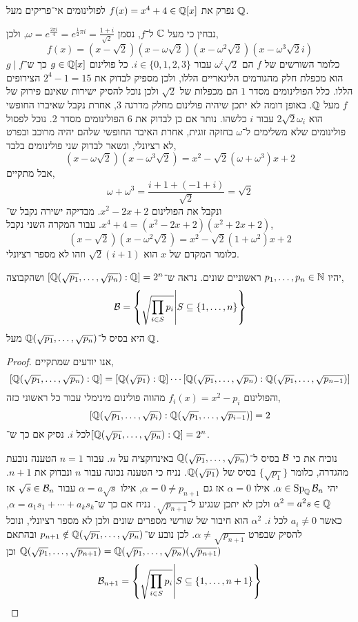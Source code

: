 \question{}
נפרק את $f(x) = x^4 + 4 \in \mathbb{Q}[x]$ לפולינומים אי־פריקים מעל $\mathbb{Q}$.
\begin{solution}
	נבחין כי מעל $\mathbb{C}$ ל־$f$, נסמן $\omega = e^{\frac{2 \pi i}{4}} = e^{\frac{1}{2} \pi i} = \frac{1 + i}{\sqrt{2}}$, ולכן,
	\[
		f(x)
		= (x - \sqrt{2})(x - \omega \sqrt{2})(x - \omega^2 \sqrt{2})(x - \omega^3 \sqrt{2} i)
	\]
	כלומר השורשים של $f$ הם $\omega^i \sqrt{2}$ עבור $i \in \{0, 1, 2, 3\}$.
	כל פולינום $g \in \mathbb{Q}[x]$ כך ש־$g \mid f$ הוא מכפלת חלק מהגורמים הלינאריים הללו, ולכן מספיק לבדוק את $2^4 - 1 = 15$ הצירופים הללו.
	כלל הפולינומים מסדר $1$ הם מכפלות של $\sqrt{2}$ ולכן נוכל להסיק ישירות שאינם פירוק של $f$ מעל $\mathbb{Q}$.
	באופן דומה לא יתכן שיהיה פולינום מחלק מדרגה 3, אחרת נקבל שאיברו החופשי הוא $2 \sqrt{2} \omega_i$ עבור $i$ כלשהו.
	נותר אם כן לבדוק את 6 הפולינומים מסדר 2.
	נוכל לפסול פולינומים שלא משלימים ל־$\omega$ בחזקה זוגית, אחרת האיבר החופשי שלהם יהיה מרוכב ובפרט לא רציונלי, ונשאר לבדוק שני פולינומים בלבד,
	\[
		(x - \omega \sqrt{2}) (x - \omega^3 \sqrt{2})
		= x^2 - \sqrt{2}(\omega + \omega^3) x + 2
	\]
	אבל מתקיים,
	\[
		\omega + \omega^3
		= \frac{i + 1 + (-1 + i)}{\sqrt{2}}
		= \sqrt{2}
	\]
	ונקבל את הפולינום $x^2 - 2x + 2$.
	מבדיקה ישירה נקבל ש־$x^4 + 4 = (x^2 - 2x + 2)(x^2 + 2x + 2)$.
	עבור המקרה השני נקבל,
	\[
		(x - \sqrt{2})(x - \omega^2 \sqrt{2})
		= x^2 - \sqrt{2} (1 + \omega^2) x + 2
	\]
	כלומר המקדם של $x$ הוא $\sqrt{2}(i + 1)$ וזהו לא מספר רציונלי.
\end{solution}

\question{}
יהיו $p_1, \ldots, p_n \in \mathbb{N}$ ראשוניים שונים.
נראה ש־$[\mathbb{Q}(\sqrt{p_1}, \ldots, \sqrt{p_n}) : \mathbb{Q}] = 2^n$ ושהקבוצה,
\[
	\mathcal{B}
	= \left\{ \sqrt{\prod_{i \in S} p_i} \middle| S \subseteq \{1, \ldots, n\} \right\}
\]
היא בסיס ל־$\mathbb{Q}(\sqrt{p_1}, \ldots, \sqrt{p_n})$ מעל $\mathbb{Q}$.
\begin{proof}
	אנו יודעים שמתקיים,
	\[
		[\mathbb{Q}(\sqrt{p_1}, \ldots, \sqrt{p_n}) : \mathbb{Q}]
		= [\mathbb{Q}(\sqrt{p_1}) : \mathbb{Q} ] \cdots [\mathbb{Q}(\sqrt{p_1}, \ldots, \sqrt{p_n}) : \mathbb{Q}(\sqrt{p_1}, \ldots, \sqrt{p_{n - 1}}) ]
	\]
	והפולינום $f_i(x) = x^2 - p_i$ מהווה פולינום מינימלי עבור כל ראשוני כזה,
	\[
		[\mathbb{Q}(\sqrt{p_1}, \ldots, \sqrt{p_i}) : \mathbb{Q}(\sqrt{p_1}, \ldots, \sqrt{p_{i - 1}}) ] = 2
	\]
	לכל $i$.
	נסיק אם כך ש־$[\mathbb{Q}(\sqrt{p_1}, \ldots, \sqrt{p_n}) : \mathbb{Q}] = 2^n$.

	נוכיח את כי $\mathcal{B}$ בסיס ל־$\mathbb{Q}(\sqrt{p_1}, \ldots, \sqrt{p_n})$ באינדוקציה על $n$.
	עבור $n = 1$ הטענה נובעת מהגדרה, כלומר $\{ \sqrt{p_1} \}$ בסיס של $\mathbb{Q}(\sqrt{p_1})$.
	נניח כי הטענה נכונה עבור $n$ ונבדוק את $n + 1$.
	יהי $\alpha \in \operatorname{Sp}_{\mathbb{Q}} \mathcal{B}_n$. אילו $\alpha = 0$ אז גם $\alpha = 0 \ne p_{n + 1}$, אילו $\alpha = a \sqrt{s}$ עבור $\sqrt{s} \in \mathcal{B}_n$ אז $\alpha^2 = a^2 s \in \mathbb{Q}$ ולכן לא יתכן שנגיע ל־$\sqrt{p_{n + 1}}$.
	נניח אם כך ש־$\alpha = a_1 s_1 + \cdots + a_k s_k$, כאשר $a_i \ne 0$ לכל $i$.
	$\alpha^2$ הוא חיבור של שורשי מספרים שונים ולכן לא מספר רציונלי, ונוכל להסיק שבפרט $\alpha \ne \sqrt{p_{n + 1}}$.
	לכן נובע ש־$p_{n + 1} \notin \mathbb{Q}(\sqrt{p_1}, \ldots, \sqrt{p_n})$ ובהתאם $\mathbb{Q}(\sqrt{p_1}, \ldots, \sqrt{p_{n + 1}}) = \mathbb{Q}(\sqrt{p_1}, \ldots, \sqrt{p_n})(\sqrt{p_{n + 1}})$ וכן
	\[
		\mathcal{B}_{n + 1}
		= \left\{ \sqrt{\prod_{i \in S} p_i} \middle| S \subseteq \{1, \ldots, n + 1\} \right\}
	\]
\end{proof}

